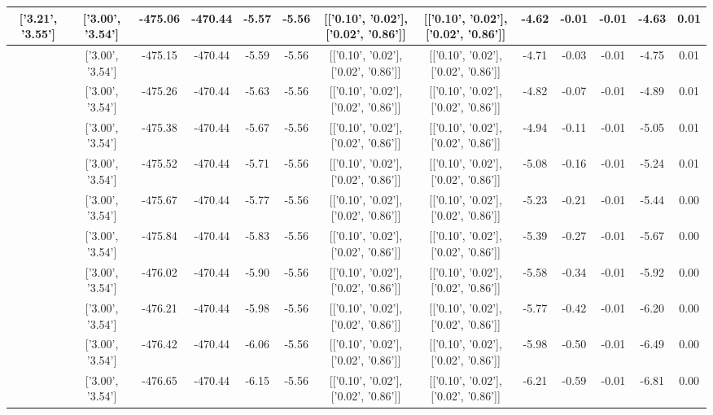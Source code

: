 \begin{table}[htbp]
\begin{adjustbox}{angle=90}
\begin{tabular}{|c|c|c|c|c|c|c|c|c|c|c|c|c|}
 ['3.21', '3.55'] & ['3.00', '3.54'] & -475.06 & -470.44 & -5.57 & -5.56 & [['0.10', '0.02'], ['0.02', '0.86']] & [['0.10', '0.02'], ['0.02', '0.86']] & -4.62 & -0.01 & -0.01 & -4.63 & 0.01\\ \hline
 ['3.25', '3.56'] & ['3.00', '3.54'] & -475.15 & -470.44 & -5.59 & -5.56 & [['0.10', '0.02'], ['0.02', '0.86']] & [['0.10', '0.02'], ['0.02', '0.86']] & -4.71 & -0.03 & -0.01 & -4.75 & 0.01\\ \hline
 ['3.29', '3.56'] & ['3.00', '3.54'] & -475.26 & -470.44 & -5.63 & -5.56 & [['0.10', '0.02'], ['0.02', '0.86']] & [['0.10', '0.02'], ['0.02', '0.86']] & -4.82 & -0.07 & -0.01 & -4.89 & 0.01\\ \hline
 ['3.33', '3.56'] & ['3.00', '3.54'] & -475.38 & -470.44 & -5.67 & -5.56 & [['0.10', '0.02'], ['0.02', '0.86']] & [['0.10', '0.02'], ['0.02', '0.86']] & -4.94 & -0.11 & -0.01 & -5.05 & 0.01\\ \hline
 ['3.36', '3.56'] & ['3.00', '3.54'] & -475.52 & -470.44 & -5.71 & -5.56 & [['0.10', '0.02'], ['0.02', '0.86']] & [['0.10', '0.02'], ['0.02', '0.86']] & -5.08 & -0.16 & -0.01 & -5.24 & 0.01\\ \hline
 ['3.40', '3.57'] & ['3.00', '3.54'] & -475.67 & -470.44 & -5.77 & -5.56 & [['0.10', '0.02'], ['0.02', '0.86']] & [['0.10', '0.02'], ['0.02', '0.86']] & -5.23 & -0.21 & -0.01 & -5.44 & 0.00\\ \hline
 ['3.44', '3.57'] & ['3.00', '3.54'] & -475.84 & -470.44 & -5.83 & -5.56 & [['0.10', '0.02'], ['0.02', '0.86']] & [['0.10', '0.02'], ['0.02', '0.86']] & -5.39 & -0.27 & -0.01 & -5.67 & 0.00\\ \hline
 ['3.48', '3.57'] & ['3.00', '3.54'] & -476.02 & -470.44 & -5.90 & -5.56 & [['0.10', '0.02'], ['0.02', '0.86']] & [['0.10', '0.02'], ['0.02', '0.86']] & -5.58 & -0.34 & -0.01 & -5.92 & 0.00\\ \hline
 ['3.52', '3.57'] & ['3.00', '3.54'] & -476.21 & -470.44 & -5.98 & -5.56 & [['0.10', '0.02'], ['0.02', '0.86']] & [['0.10', '0.02'], ['0.02', '0.86']] & -5.77 & -0.42 & -0.01 & -6.20 & 0.00\\ \hline
 ['3.55', '3.58'] & ['3.00', '3.54'] & -476.42 & -470.44 & -6.06 & -5.56 & [['0.10', '0.02'], ['0.02', '0.86']] & [['0.10', '0.02'], ['0.02', '0.86']] & -5.98 & -0.50 & -0.01 & -6.49 & 0.00\\ \hline
 ['3.59', '3.58'] & ['3.00', '3.54'] & -476.65 & -470.44 & -6.15 & -5.56 & [['0.10', '0.02'], ['0.02', '0.86']] & [['0.10', '0.02'], ['0.02', '0.86']] & -6.21 & -0.59 & -0.01 & -6.81 & 0.00\\ \hline

\end{tabular}
\end{adjustbox}
\end{table}
